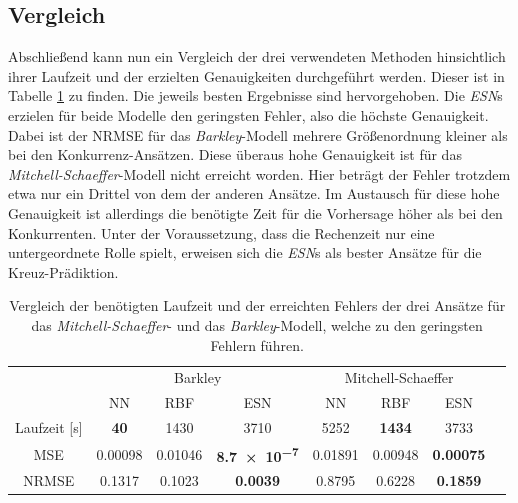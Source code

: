 \subsection{Vergleich}
Abschließend kann nun ein Vergleich der drei verwendeten Methoden hinsichtlich ihrer Laufzeit und der erzielten Genauigkeiten durchgeführt werden. Dieser ist in Tabelle \ref{tab:exp_cross_comparison_results} zu finden. Die jeweils  besten Ergebnisse sind hervorgehoben. Die \textit{ESN}s erzielen für beide Modelle den geringsten Fehler, also die höchste Genauigkeit. Dabei ist der NRMSE für das \textit{Barkley}-Modell mehrere Größenordnung kleiner als bei den Konkurrenz-Ansätzen. Diese überaus hohe Genauigkeit ist für das \textit{Mitchell-Schaeffer}-Modell nicht erreicht worden. Hier beträgt der Fehler trotzdem etwa nur ein Drittel von dem der anderen Ansätze. Im Austausch für diese hohe Genauigkeit ist allerdings die benötigte Zeit für die Vorhersage höher als bei den Konkurrenten. Unter der Voraussetzung, dass die Rechenzeit nur eine untergeordnete Rolle spielt, erweisen sich die \textit{ESN}s als bester Ansätze für die Kreuz-Prädiktion.
\begin{table}[h]
	\centering
	\captionsetup{width=0.9\linewidth}
	\begin{tabular}{cccccccc}
		\hline		
		\multicolumn{1}{c}{} & \multicolumn{3}{c}{Barkley} & \multicolumn{3}{c}{Mitchell-Schaeffer}		\\
		\multicolumn{1}{c}{} & NN & RBF & ESN & NN & RBF & ESN \\
		
		\hline
		
		Laufzeit [s] 	& \textbf{40} 		& 1430		& 3710		& 5252		& \textbf{1434} 		& 3733 \\
		MSE 			& 0.00098	& 0.01046	& \textbf{\num{8.7e-7}} 	& 0.01891	& 0.00948 	& \textbf{0.00075} \\
		NRMSE 			& 0.1317	& 0.1023	& \textbf{\num{0.0039}} 	& 0.8795	& 0.6228 	& \textbf{0.1859} \\
		\hline 
	\end{tabular} 
	\caption{Vergleich der benötigten Laufzeit und der erreichten Fehlers der drei Ansätze für das \textit{Mitchell-Schaeffer}- und das \textit{Barkley}-Modell, welche zu den geringsten Fehlern führen.}
	\label{tab:exp_cross_comparison_results}
\end{table}

\FloatBarrier